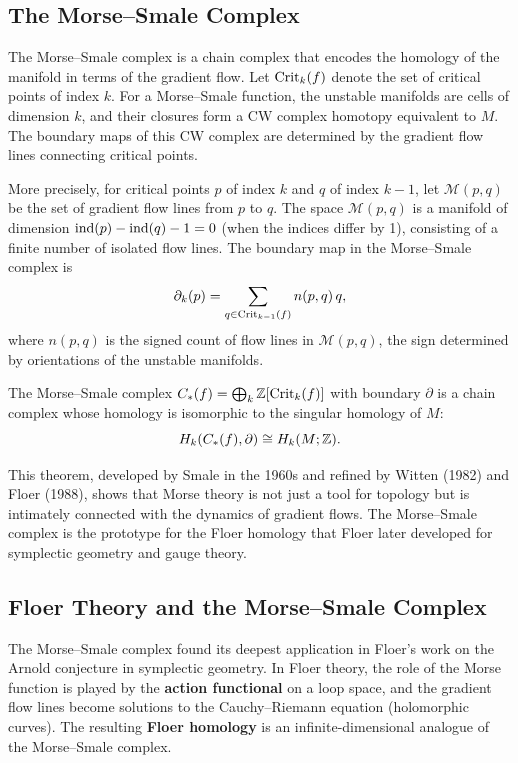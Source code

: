\subsection{The Morse--Smale Complex}

The Morse--Smale complex is a chain complex that encodes the homology of the manifold in terms of the gradient flow. Let \(\operatorname{Crit}_k(f)\) denote the set of critical points of index \(k\). For a Morse--Smale function, the unstable manifolds are cells of dimension \(k\), and their closures form a CW complex homotopy equivalent to \(M\). The boundary maps of this CW complex are determined by the gradient flow lines connecting critical points.

More precisely, for critical points \(p\) of index \(k\) and \(q\) of index \(k-1\), let \(\mathcal{M}(p,q)\) be the set of gradient flow lines from \(p\) to \(q\). The space \(\mathcal{M}(p,q)\) is a manifold of dimension \(\operatorname{ind}(p) - \operatorname{ind}(q) - 1 = 0\) (when the indices differ by 1), consisting of a finite number of isolated flow lines. The boundary map in the Morse--Smale complex is
\[
\partial_k(p) = \sum_{q \in \operatorname{Crit}_{k-1}(f)} n(p,q)\, q,
\]
where \(n(p,q)\) is the signed count of flow lines in \(\mathcal{M}(p,q)\), the sign determined by orientations of the unstable manifolds.

\begin{theorem}
The Morse--Smale complex \(C_*(f) = \bigoplus_{k} \mathbb{Z}[\operatorname{Crit}_k(f)]\) with boundary \(\partial\) is a chain complex whose homology is isomorphic to the singular homology of \(M\):
\[
H_k(C_*(f), \partial) \cong H_k(M; \mathbb{Z}).
\]
\end{theorem}

This theorem, developed by Smale in the 1960s and refined by Witten (1982) and Floer (1988), shows that Morse theory is not just a tool for topology but is intimately connected with the dynamics of gradient flows. The Morse--Smale complex is the prototype for the Floer homology that Floer later developed for symplectic geometry and gauge theory.

\subsection{Floer Theory and the Morse--Smale Complex}

The Morse--Smale complex found its deepest application in Floer's work on the Arnold conjecture in symplectic geometry. In Floer theory, the role of the Morse function is played by the \textbf{action functional} on a loop space, and the gradient flow lines become solutions to the Cauchy--Riemann equation (holomorphic curves). The resulting \textbf{Floer homology} is an infinite-dimensional analogue of the Morse--Smale complex.

